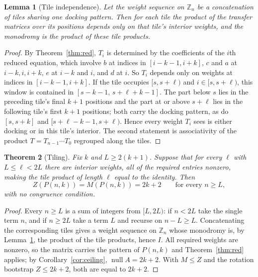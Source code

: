 \documentclass[11pt]{article}
\newtheorem{theorem}{Theorem}
\newtheorem{lemma}[theorem]{Lemma}
\theoremstyle{definition}
\begin{document}
\begin{lemma}[Tile independence]\label{lem:tile}
Let the weight sequence on $\mathbb Z_n$ be a concatenation of tiles sharing one
docking pattern. Then for each tile the product of the transfer matrices over
its positions depends only on that tile's interior weights, and the monodromy is
the product of these tile products.
\end{lemma}

\begin{proof}
By Theorem~\ref{thm:red}, $T_i$ is determined by the coefficients of the
$i$th reduced equation, which involve $b$ at indices in $[i-k-1,i+k]$, $c$ and
$a$ at $i-k,i,i+k$, $e$ at $i-k$ and $i$, and $d$ at $i$. So $T_i$ depends only
on weights at indices in $[i-k-1,i+k]$. If the tile occupies $[s,s+\ell)$ and
$i\in[s,s+\ell)$, this window is contained in
$[s-k-1,\,s+\ell+k-1]$. The part below $s$ lies in the preceding tile's final
$k+1$ positions and the part at or above $s+\ell$ lies in the following tile's
first $k+1$ positions; both carry the docking pattern, as do $[s,s+k]$ and
$[s+\ell-k-1,s+\ell)$. Hence every weight $T_i$ sees is either docking or in
this tile's interior. The second statement is associativity of the product
$T=T_{n-1}\cdots T_0$ regrouped along the tiles.
\end{proof}

\begin{theorem}[Tiling]\label{thm:tiling}
Fix $k$ and $L\ge2(k+1)$. Suppose that for every $\ell$ with $L\le\ell<2L$ there
are interior weights, all of the required entries nonzero, making the tile
product of length $\ell$ equal to the identity. Then
\[
  Z(P(n,k))=M(P(n,k))=2k+2\qquad\text{for every }n\ge L,
\]
with no congruence condition.
\end{theorem}

\begin{proof}
Every $n\ge L$ is a sum of integers from $[L,2L)$: if $n<2L$ take the single
term $n$, and if $n\ge2L$ take a term $L$ and recurse on $n-L\ge L$.
Concatenating the corresponding tiles gives a weight sequence on $\mathbb Z_n$
whose monodromy is, by Lemma~\ref{lem:tile}, the product of the tile products,
hence $I$. All required weights are nonzero, so the matrix carries the pattern
of $P(n,k)$ and Theorem~\ref{thm:red} applies; by
Corollary~\ref{cor:ceiling}, $\operatorname{null}A=2k+2$. With $M\le Z$ and the
rotation bootstrap $Z\le2k+2$, both are equal to $2k+2$.
\end{proof}
\end{document}
